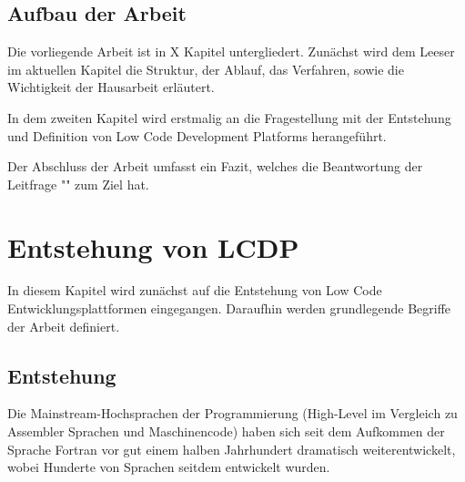 \documentclass{article}
\begin{document}
	\subsection{Aufbau der Arbeit}
	Die vorliegende Arbeit ist in X Kapitel untergliedert. Zunächst wird dem Leeser im aktuellen Kapitel die Struktur, der Ablauf, das Verfahren, sowie die Wichtigkeit der Hausarbeit erläutert. 
	
	In dem zweiten Kapitel wird erstmalig an die Fragestellung mit der Entstehung und Definition von Low Code Development Platforms herangeführt. 
	
	
	Der Abschluss der Arbeit umfasst ein Fazit, welches die Beantwortung der Leitfrage "" zum Ziel hat.
	
	\section{Entstehung von LCDP}
	In diesem Kapitel wird zunächst auf die Entstehung von Low Code Entwicklungsplattformen eingegangen. Daraufhin werden grundlegende Begriffe der Arbeit definiert. 
	
	\subsection{Entstehung}	
	Die Mainstream-Hochsprachen der Programmierung (High-Level im Vergleich zu Assembler Sprachen und Maschinencode) haben sich seit dem Aufkommen der Sprache Fortran vor gut einem halben Jahrhundert dramatisch weiterentwickelt, wobei Hunderte von Sprachen seitdem entwickelt wurden.\cite{Margaria.2021}
	
	
	
\end{document}
